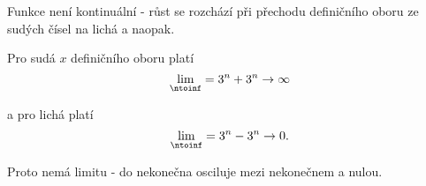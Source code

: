 
Funkce není kontinuální - růst se rozchází při přechodu definičního oboru ze sudých čísel na lichá a naopak. 

\vspace{1cm}

Pro sudá $x$ definičního oboru platí
$$ \lim_{\ntoinf} = 3^n + 3^n \rightarrow \infty $$

a pro lichá platí
$$ \lim_{\ntoinf} = 3^n - 3^n \rightarrow 0 . $$

Proto nemá limitu - do nekonečna osciluje mezi nekonečnem a nulou.

\pagebreak

